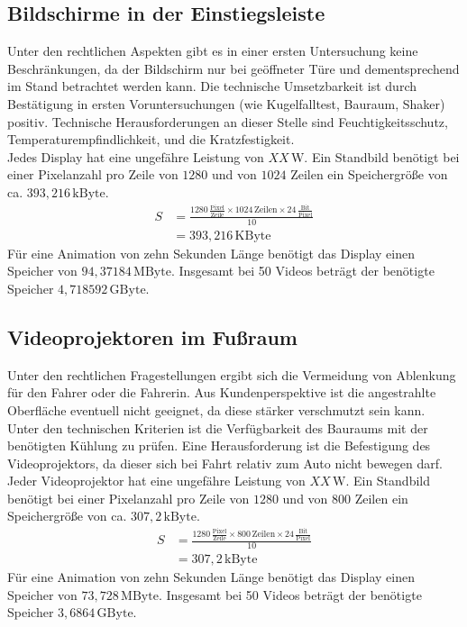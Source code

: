 \subsection{Bildschirme in der Einstiegsleiste}
Unter den rechtlichen Aspekten gibt es in einer ersten Untersuchung keine Beschränkungen, da der Bildschirm nur bei geöffneter Türe und dementsprechend im Stand betrachtet werden kann.
Die technische Umsetzbarkeit ist durch Bestätigung in ersten Voruntersuchungen (wie Kugelfalltest, Bauraum, Shaker) positiv.
Technische Herausforderungen an dieser Stelle sind Feuchtigkeitsschutz, Temperaturempfindlichkeit, und die Kratzfestigkeit. \\
Jedes Display hat eine ungefähre Leistung von $ XX\,\mathrm{W} $. 
Ein Standbild benötigt bei einer Pixelanzahl pro Zeile von $ 1280 $ und von $ 1024 $ Zeilen ein Speichergröße von ca. $ 393,216\,\mathrm{kByte}$. 
\begin{align}
	S &= \frac{1280\,\frac{\mathrm{Pixel}}{\mathrm{Zeile}}\times 1024\,\mathrm{Zeilen} \times 24\,\frac{\mathrm{Bit}}{\mathrm{Pixel}}}{10} \\
	&= 393,216\,\mathrm{KByte}
\end{align}
Für eine Animation von zehn Sekunden Länge benötigt das Display einen Speicher von $ 94,37184\,\mathrm{MByte}$.
Insgesamt bei 50 Videos beträgt der benötigte Speicher $ 4,718592\,\mathrm{GByte}$.
\subsection{Videoprojektoren im Fußraum}
Unter den rechtlichen Fragestellungen ergibt sich die Vermeidung von Ablenkung für den Fahrer oder die Fahrerin.
Aus Kundenperspektive ist die angestrahlte Oberfläche eventuell nicht geeignet, da diese stärker verschmutzt sein kann. \\
Unter den technischen Kriterien ist die Verfügbarkeit des Bauraums mit der benötigten Kühlung zu prüfen. Eine Herausforderung ist die Befestigung des Videoprojektors, da dieser sich bei Fahrt relativ zum Auto nicht bewegen darf.
Jeder Videoprojektor hat eine ungefähre Leistung von $ XX\,\mathrm{W} $. 
Ein Standbild benötigt bei einer Pixelanzahl pro Zeile von $ 1280 $ und von $ 800 $ Zeilen ein Speichergröße von ca. $ 307,2\,\mathrm{kByte}$. 
\begin{align}
	S &= \frac{1280\,\frac{\mathrm{Pixel}}{\mathrm{Zeile}}\times 800\,\mathrm{Zeilen} \times 24\,\frac{\mathrm{Bit}}{\mathrm{Pixel}}}{10} \\
	&= 307,2\,\mathrm{kByte}
\end{align}
Für eine Animation von zehn Sekunden Länge benötigt das Display einen Speicher von $ 73,728\,\mathrm{MByte}$.
Insgesamt bei 50 Videos beträgt der benötigte Speicher $ 3,6864\,\mathrm{GByte}$.
